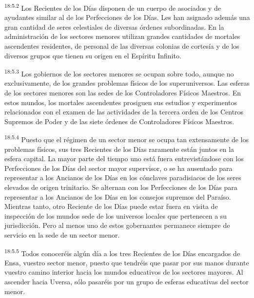 \par
\textsuperscript{18:5.2} Los Recientes de los Días disponen de un cuerpo de asociados y de ayudantes similar al de los Perfecciones de los Días. Les han asignado además una gran cantidad de seres celestiales de diversas órdenes subordinadas. En la administración de los sectores menores utilizan grandes cantidades de mortales ascendentes residentes, de personal de las diversas colonias de cortesía y de los diversos grupos que tienen su origen en el Espíritu Infinito.

\par
\textsuperscript{18:5.3} Los gobiernos de los sectores menores se ocupan sobre todo, aunque no exclusivamente, de los grandes problemas físicos de los superuniversos. Las esferas de los sectores menores son las sedes de los Controladores Físicos Maestros. En estos mundos, los mortales ascendentes prosiguen sus estudios y experimentos relacionados con el examen de las actividades de la tercera orden de los Centros Supremos de Poder y de las siete órdenes de Controladores Físicos Maestros.

\par
\textsuperscript{18:5.4} Puesto que el régimen de un sector menor se ocupa tan extensamente de los problemas físicos, sus tres Recientes de los Días raramente están juntos en la esfera capital. La mayor parte del tiempo uno está fuera entrevistándose con los Perfecciones de los Días del sector mayor supervisor, o se ha ausentado para representar a los Ancianos de los Días en los cónclaves paradisiacos de los seres elevados de origen trinitario. Se alternan con los Perfecciones de los Días para representar a los Ancianos de los Días en los consejos supremos del Paraíso. Mientras tanto, otro Reciente de los Días puede estar fuera en visita de inspección de los mundos sede de los universos locales que pertenecen a su jurisdicción. Pero al menos uno de estos gobernantes permanece siempre de servicio en la sede de un sector menor.

\par
\textsuperscript{18:5.5} Todos conoceréis algún día a los tres Recientes de los Días encargados de Ensa, vuestro sector menor, puesto que tendréis que pasar por sus manos durante vuestro camino interior hacia los mundos educativos de los sectores mayores. Al ascender hacia Uversa, sólo pasaréis por un grupo de esferas educativas del sector menor.

